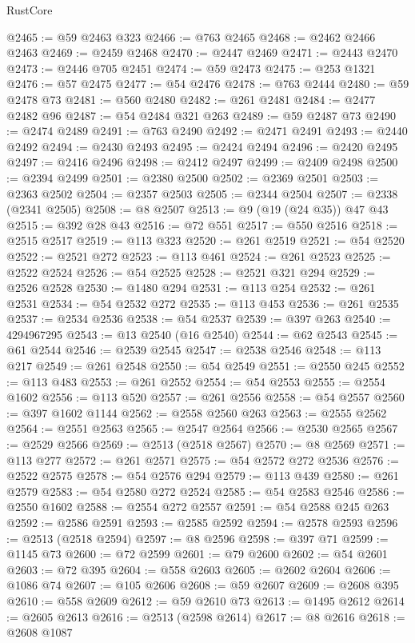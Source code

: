 \begin{lexlean}{RustCore}
\begin{coremodule}
@2465 := @59 @2463 @323
@2466 := @763 @2465
@2468 := @2462 @2466 @2463
@2469 := @2459 @2468
@2470 := @2447 @2469
@2471 := @2443 @2470
@2473 := @2446 @705 @2451
@2474 := @59 @2473
@2475 := @253 @1321
@2476 := @57 @2475
@2477 := @54 @2476
@2478 := @763 @2444
@2480 := @59 @2478 @73
@2481 := @560 @2480
@2482 := @261 @2481
@2484 := @2477 @2482 @96
@2487 := @54 @2484 @321 @263
@2489 := @59 @2487 @73
@2490 := @2474 @2489
@2491 := @763 @2490
@2492 := @2471 @2491
@2493 := @2440 @2492
@2494 := @2430 @2493
@2495 := @2424 @2494
@2496 := @2420 @2495
@2497 := @2416 @2496
@2498 := @2412 @2497
@2499 := @2409 @2498
@2500 := @2394 @2499
@2501 := @2380 @2500
@2502 := @2369 @2501
@2503 := @2363 @2502
@2504 := @2357 @2503
@2505 := @2344 @2504
@2507 := @2338 (@2341 @2505)
@2508 := @8 @2507
@2513 := @9 (@19 (@24 @35)) @47 @43
@2515 := @392 @28 @43
@2516 := @72 @551
@2517 := @550 @2516
@2518 := @2515 @2517
@2519 := @113 @323
@2520 := @261 @2519
@2521 := @54 @2520
@2522 := @2521 @272
@2523 := @113 @461
@2524 := @261 @2523
@2525 := @2522 @2524
@2526 := @54 @2525
@2528 := @2521 @321 @294
@2529 := @2526 @2528
@2530 := @1480 @294
@2531 := @113 @254
@2532 := @261 @2531
@2534 := @54 @2532 @272
@2535 := @113 @453
@2536 := @261 @2535
@2537 := @2534 @2536
@2538 := @54 @2537
@2539 := @397 @263
@2540 := 4294967295
@2543 := @13 @2540 (@16 @2540)
@2544 := @62 @2543
@2545 := @61 @2544
@2546 := @2539 @2545
@2547 := @2538 @2546
@2548 := @113 @217
@2549 := @261 @2548
@2550 := @54 @2549
@2551 := @2550 @245
@2552 := @113 @483
@2553 := @261 @2552
@2554 := @54 @2553
@2555 := @2554 @1602
@2556 := @113 @520
@2557 := @261 @2556
@2558 := @54 @2557
@2560 := @397 @1602 @1144
@2562 := @2558 @2560 @263
@2563 := @2555 @2562
@2564 := @2551 @2563
@2565 := @2547 @2564
@2566 := @2530 @2565
@2567 := @2529 @2566
@2569 := @2513 (@2518 @2567)
@2570 := @8 @2569
@2571 := @113 @277
@2572 := @261 @2571
@2575 := @54 @2572 @272 @2536
@2576 := @2522 @2575
@2578 := @54 @2576 @294
@2579 := @113 @439
@2580 := @261 @2579
@2583 := @54 @2580 @272 @2524
@2585 := @54 @2583 @2546
@2586 := @2550 @1602
@2588 := @2554 @272 @2557
@2591 := @54 @2588 @245 @263
@2592 := @2586 @2591
@2593 := @2585 @2592
@2594 := @2578 @2593
@2596 := @2513 (@2518 @2594)
@2597 := @8 @2596
@2598 := @397 @71
@2599 := @1145 @73
@2600 := @72 @2599
@2601 := @79 @2600
@2602 := @54 @2601
@2603 := @72 @395
@2604 := @558 @2603
@2605 := @2602 @2604
@2606 := @1086 @74
@2607 := @105 @2606
@2608 := @59 @2607
@2609 := @2608 @395
@2610 := @558 @2609
@2612 := @59 @2610 @73
@2613 := @1495 @2612
@2614 := @2605 @2613
@2616 := @2513 (@2598 @2614)
@2617 := @8 @2616
@2618 := @2608 @1087

\end{coremodule}
\end{lexlean}
